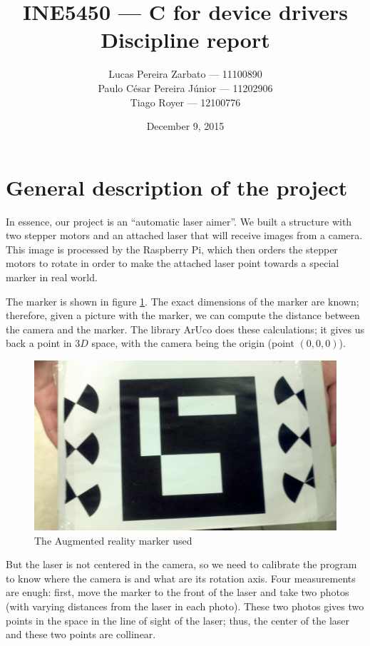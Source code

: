 \documentclass{article}
\begin{document}
\title{
    INE5450 --- C for device drivers \\
    Discipline report
}
\author{
    Lucas Pereira Zarbato --- 11100890 \\
    Paulo César Pereira Júnior --- 11202906 \\
    Tiago Royer --- 12100776
}
\date{December 9, 2015}
\maketitle

\section{General description of the project}

In essence, our project is an ``automatic laser aimer''.
We built a structure with two stepper motors and an attached laser
that will receive images from a camera.
This image is processed by the Raspberry Pi,
which then orders the stepper motors to rotate in order to
make the attached laser point towards a special marker in real world.

The marker is shown in figure \ref{fig:marker}.
The exact dimensions of the marker are known;
therefore, given a picture with the marker,
we can compute the distance between the camera and the marker.
The library ArUco does these calculations;
it gives us back a point in $3D$ space,
with the camera being the origin (point $(0, 0, 0)$).

\begin{figure}[h!]
    \includegraphics[scale=0.1]{imgs/marker.jpg}
    \caption{The Augmented reality marker used}
    \label{fig:marker}
\end{figure}

But the laser is not centered in the camera,
so we need to calibrate the program to know where the camera is
and what are its rotation axis.
Four measurements are enugh:
first, move the marker to the front of the laser and take two photos
(with varying distances from the laser in each photo).
These two photos gives two points in the space
in the line of sight of the laser;
thus, the center of the laser and these two points are collinear.
\end{document}
